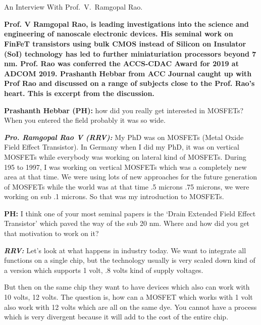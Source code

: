 \chapter{}

\centerline{{\large An Interview With Prof.\ V.\ Ramgopal Rao.}}

\vskip 1cm

\begin{multicols}{2}

\textbf{Prof. V Ramgopal Rao, is leading investigations into the science and engineering of nanoscale electronic devices. His seminal work on FinFeT transistors using bulk  CMOS instead of Silicon on Insulator (SoI) technology has led to further miniaturiation processors beyond 7 nm. Prof. Rao was conferred the ACCS-CDAC Award for 2019 at ADCOM 2019. Prashanth Hebbar from ACC Journal caught up with Prof Rao and discussed on a range of subjects close to the Prof. Rao’s heart. This is excerpt from the discussion.}

\textbf{Prashanth Hebbar (PH):} how did you really get interested in MOSFETs? When you entered the field probably it was so wide.

\textbf{\textit {Pro. Ramgopal Rao V (RRV):}} My PhD was on MOSFETs (Metal Oxide Field Effect Transistor). In Germany when I did my PhD, it was on vertical MOSFETs while everybody was working on lateral kind of MOSFETs. During 195 to 1997, I was working on vertical MOSFETs which was a completely new area at that time. We were using lots of new approaches for the future generation of MOSFETs while the world was at that time .5 microns .75 microns, we were working on sub .1 microns. So that was my introduction to MOSFETs.

\textbf{PH:}  I think one of your most seminal papers is the ‘Drain Extended Field Effect Transistor’ which paved the way of the sub 20 nm. Where and how did you get that motivation to work on it?

\textbf{\textit {RRV:}} Let’s look at what happens in industry today. We want to integrate all functions on a single chip, but the technology usually is very scaled down kind of a version which supports 1 volt, .8 volts kind of supply voltages.

But then on the same chip they want to have devices which also can work with 10 volts, 12 volts. The question is, how can a MOSFET which works with 1 volt also work with 12 volts which are all on the same dye. You cannot have a process which is very divergent because it will add to the cost of the entire chip.


\end{multicols}
